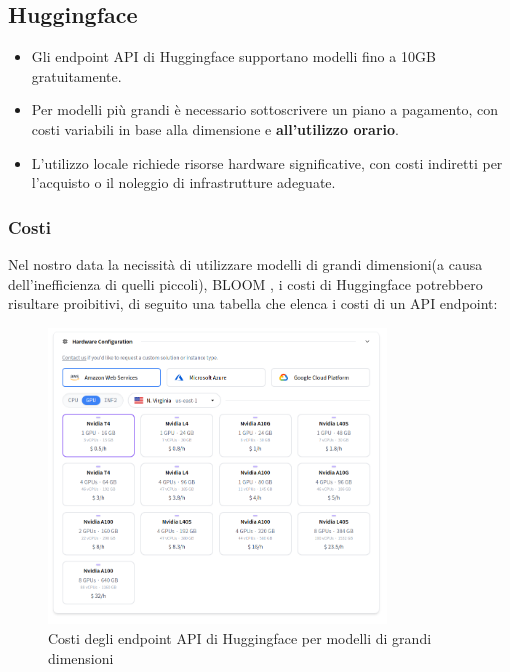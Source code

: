 \documentclass{article}
\begin{document}
\subsection{Huggingface}
\begin{itemize}
    \item Gli endpoint API di Huggingface supportano modelli fino a 10GB gratuitamente.
    \item Per modelli più grandi è necessario sottoscrivere un piano a pagamento, con costi variabili in base alla dimensione e \textbf{all'utilizzo orario}.
    \item L'utilizzo locale richiede risorse hardware significative, con costi indiretti per l'acquisto o il noleggio di infrastrutture adeguate.
\end{itemize}

\subsubsection{Costi}
Nel nostro data la necissità di utilizzare modelli di grandi dimensioni(a causa dell'inefficienza di quelli piccoli), BLOOM , i costi di Huggingface potrebbero risultare proibitivi, di seguito una tabella che elenca i costi di un API endpoint:

\begin{figure}[H]
    \centering
    \includegraphics[width=0.8\textwidth]{img/costi_hugginface_api_endpoint.png}
    \caption{Costi degli endpoint API di Huggingface per modelli di grandi dimensioni}
    \label{fig:costi_hugginface_api_endpoint}
\end{figure}
\end{document}
